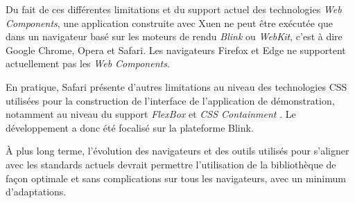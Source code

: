 Du fait de ces différentes limitations et du support actuel des technologies \emph{Web Components}, une application construite avec Xuen ne peut être exécutée que dans un navigateur basé sur les moteurs de rendu \emph{Blink} ou \emph{WebKit}, c'est à dire Google Chrome, Opera et Safari. Les navigateurs Firefox et Edge ne supportent actuellement pas les \emph{Web Components}.

En pratique, Safari présente d'autres limitations au niveau des technologies CSS utilisées pour la construction de l'interface de l'application de démonstration, notamment au niveau du support \emph{FlexBox} \cite{w3c-css-flexbox} et \emph{CSS Containment} \cite{w3c-css-contain}. Le développement a donc été focalisé sur la plateforme Blink.

À plus long terme, l'évolution des navigateurs et des outils utilisés pour s'aligner avec les standards actuels devrait permettre l'utilisation de la bibliothèque de façon optimale et sans complications sur tous les navigateurs, avec un minimum d'adaptations.